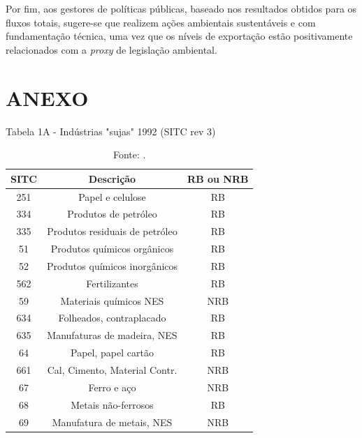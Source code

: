 \documentclass[12pt,
               openright,
               oneside,
               a4paper,
							 section=TITLE,     %
               subsection=Title,  %
               english,brazil]{article}
\begin{document}
Por fim, aos gestores de políticas públicas, baseado nos resultados obtidos para os fluxos totais, sugere-se que realizem ações ambientais sustentáveis e com fundamentação técnica, uma vez que os níveis de exportação estão positivamente relacionados com a \textit{proxy} de legislação ambiental.



\newpage

\section*{ANEXO}

\begin{table}[H]
	\centering
	\caption*{Tabela 1A - Indústrias "sujas" 1992 (SITC rev 3)}
	\label{tab:7}
	\begin{tabular}{ccc}
		  SITC & Descrição & RB ou NRB \\ \toprule  251 & Papel e celulose & RB \\ 334 & Produtos de petróleo & RB \\ 335 & Produtos residuais de petróleo & RB \\ 51 & Produtos químicos orgânicos & RB \\ 52 & Produtos químicos inorgânicos & RB \\ 562 & Fertilizantes & RB \\ 59 & Materiais químicos NES & NRB \\ 634 & Folheados, contraplacado & RB \\ 635 & Manufaturas de madeira, NES & RB \\ 64 & Papel, papel cartão & RB \\ 661 & Cal, Cimento, Material Contr. & NRB \\ 67 & Ferro e aço & NRB \\ 68 & Metais não-ferrosos & RB \\ 69 & Manufatura de metais, NES & NRB \\ \bottomrule 
	\end{tabular}
\caption*{\RaggedRight  Fonte: \cite[tradução nossa]{VanBeers1997}.}
\end{table}
\end{document}
